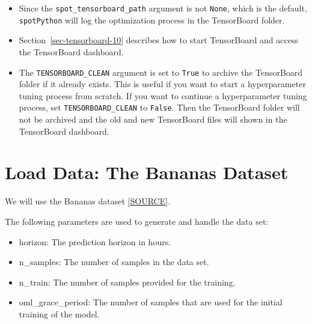 \documentclass[
  letterpaper,
  DIV=11,
  numbers=noendperiod]{scrreprt}
\providecommand{\tightlist}{%
  \setlength{\itemsep}{0pt}\setlength{\parskip}{0pt}}\usepackage{longtable,booktabs,array}
\begin{document}
\begin{tcolorbox}[enhanced jigsaw, left=2mm, toprule=.15mm, colframe=quarto-callout-tip-color-frame, leftrule=.75mm, title=\textcolor{quarto-callout-tip-color}{\faLightbulb}\hspace{0.5em}{Tip: TensorBoard}, toptitle=1mm, opacitybacktitle=0.6, arc=.35mm, titlerule=0mm, opacityback=0, bottomtitle=1mm, coltitle=black, rightrule=.15mm, colback=white, colbacktitle=quarto-callout-tip-color!10!white, breakable, bottomrule=.15mm]

\begin{itemize}
\tightlist
\item
  Since the \texttt{spot\_tensorboard\_path} argument is not
  \texttt{None}, which is the default, \texttt{spotPython} will log the
  optimization process in the TensorBoard folder.
\item
  Section~\ref{sec-tensorboard-10} describes how to start TensorBoard
  and access the TensorBoard dashboard.
\item
  The \texttt{TENSORBOARD\_CLEAN} argument is set to \texttt{True} to
  archive the TensorBoard folder if it already exists. This is useful if
  you want to start a hyperparameter tuning process from scratch. If you
  want to continue a hyperparameter tuning process, set
  \texttt{TENSORBOARD\_CLEAN} to \texttt{False}. Then the TensorBoard
  folder will not be archived and the old and new TensorBoard files will
  shown in the TensorBoard dashboard.
\end{itemize}

\end{tcolorbox}

\hypertarget{load-data-the-bananas-dataset}{%
\section{Load Data: The Bananas
Dataset}\label{load-data-the-bananas-dataset}}

We will use the Bananas dataset
\href{https://riverml.xyz/0.19.0/api/datasets/Bananas/}{{[}SOURCE{]}}.

The following parameters are used to generate and handle the data set:

\begin{itemize}
\tightlist
\item
  horizon: The prediction horizon in hours.
\item
  n\_samples: The number of samples in the data set.
\item
  n\_train: The number of samples provided for the training.
\item
  oml\_grace\_period: The number of samples that are used for the
  initial training of the model.
\end{itemize}
\end{document}
